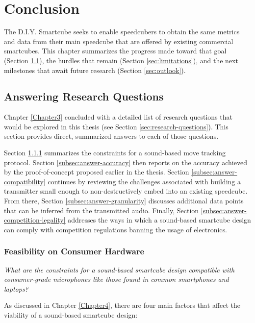 \chapter{Conclusion} 
\label{Chapter8}

The D.I.Y. Smartcube seeks to enable speedcubers to obtain the same
metrics and data from their main speedcube that are offered by existing
commercial smartcubes. This chapter summarizes the progress made toward
that goal (Section \ref{sec:answering-research-questions}), the hurdles
that remain (Section \ref{sec:limitations}), and the next milestones
that await future research (Section \ref{sec:outlook}).


\section{Answering Research Questions}
\label{sec:answering-research-questions}

Chapter \ref{Chapter3} concluded with a detailed list of research
questions that would be explored in this thesis (see Section
\ref{sec:research-questions}). This section provides direct, summarized
answers to each of those questions.

Section \ref{subsec:answer-feasibility} summarizes the constraints for
a sound-based move tracking protocol. Section
\ref{subsec:answer-accuracy} then reports on the accuracy achieved by
the proof-of-concept proposed earlier in the thesis. Section
\ref{subsec:answer-compatibility} continues by reviewing the challenges
associated with building a transmitter small enough to
non-destructively embed into an existing speedcube. From there, Section
\ref{subsec:answer-granularity} discusses additional data points that
can be inferred from the transmitted audio. Finally, Section
\ref{subsec:answer-competition-legality} addresses the ways in which a
sound-based smartcube design can comply with competition regulations
banning the usage of electronics.

\subsection{Feasibility on Consumer Hardware}
\label{subsec:answer-feasibility}

\emph{What are the constraints for a sound-based smartcube design
compatible with consumer-grade microphones like those found in common
smartphones and laptops?}

As discussed in Chapter \ref{Chapter4}, there are four main factors
that affect the viability of a sound-based smartcube design: 


